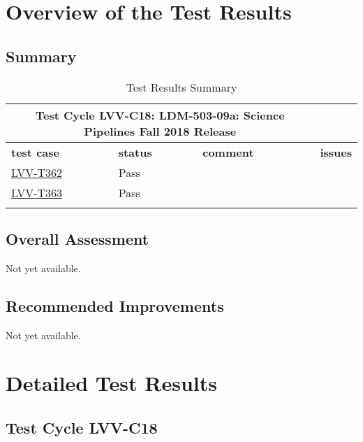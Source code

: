 \documentclass[DM,lsstdraft,STR,toc]{lsstdoc}
\begin{document}
\newpage

\section{Overview of the Test Results}
\label{sect:overview}

\subsection{Summary}
\label{sect:summarytable}

\begin{longtable}{p{}p{}p{}p{}}
\toprule
  \multicolumn{3}{c}{ Test Cycle {\bf LVV-C18: LDM-503-09a: Science Pipelines Fall 2018 Release
 }} \\\hline
  {\bf \footnotesize test case} & {\bf \footnotesize status} & {\bf \footnotesize comment} & {\bf \footnotesize issues} \\\toprule
    \href{https://jira.lsstcorp.org/secure/Tests.jspa#/testCase/LVV-T362}{LVV-T362} 
    & Pass &  &
    \\\hline
    \href{https://jira.lsstcorp.org/secure/Tests.jspa#/testCase/LVV-T363}{LVV-T363} 
    & Pass &  &
    \\\hline

\caption{Test Results Summary}
\label{table:summary}
\end{longtable}

\subsection{Overall Assessment}
\label{sect:overallassessment}

Not yet available.

\subsection{Recommended Improvements}
\label{sect:recommendations}

Not yet available.

\newpage
\section{Detailed Test Results}
\label{sect:detailedtestresults}


  \subsection{Test Cycle LVV-C18 }
\end{document}
